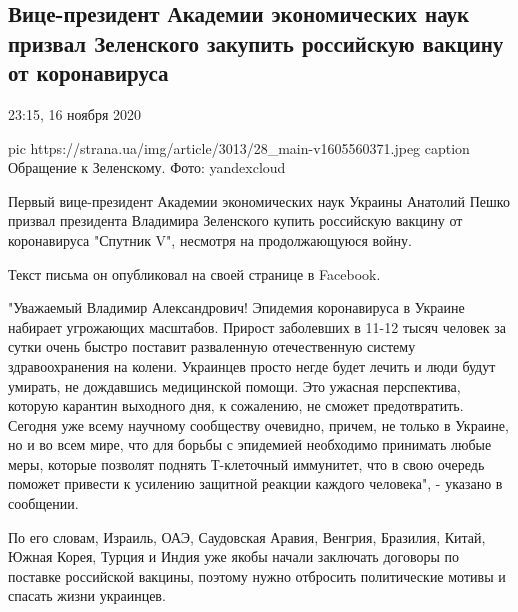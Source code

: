  
 
 

\subsection{Вице-президент Академии экономических наук призвал Зеленского закупить российскую вакцину от коронавируса}

23:15, 16 ноября 2020

\ifcmt
pic https://strana.ua/img/article/3013/28_main-v1605560371.jpeg
caption Обращение к Зеленскому. Фото: yandexcloud
\fi

Первый вице-президент Академии экономических наук Украины Анатолий Пешко
призвал президента Владимира Зеленского купить российскую вакцину от
коронавируса "Спутник V", несмотря на продолжающуюся войну. 

Текст письма он опубликовал на своей странице в Facebook.

"Уважаемый Владимир Александрович! Эпидемия коронавируса в Украине набирает
угрожающих масштабов. Прирост заболевших в 11-12 тысяч человек за сутки очень
быстро поставит разваленную отечественную систему здравоохранения на колени.
Украинцев просто негде будет лечить и люди будут умирать, не дождавшись
медицинской помощи. Это ужасная перспектива, которую карантин выходного дня, к
сожалению, не сможет предотвратить.  Сегодня уже всему научному сообществу
очевидно, причем, не только в Украине, но и во всем мире, что для борьбы с
эпидемией необходимо принимать любые меры, которые позволят поднять Т-клеточный
иммунитет, что в свою очередь поможет привести к усилению защитной реакции
каждого человека", - указано в сообщении. 

По его словам, Израиль, ОАЭ, Саудовская Аравия, Венгрия, Бразилия, Китай, Южная
Корея, Турция и Индия уже якобы начали заключать договоры по поставке
российской вакцины, поэтому нужно отбросить политические мотивы и спасать жизни
украинцев. 

